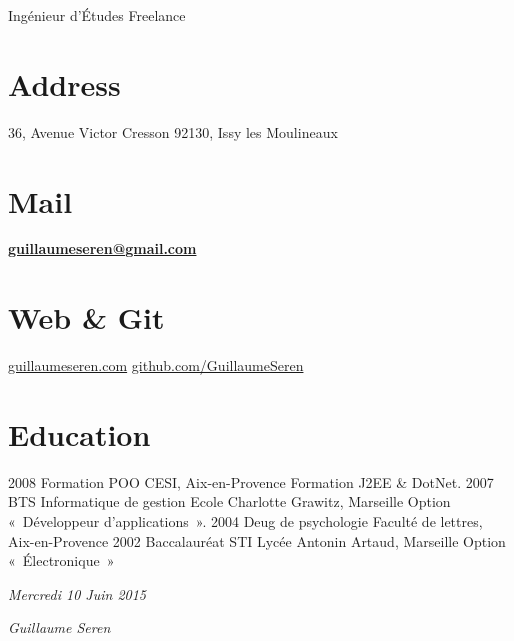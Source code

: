 
      {Ingénieur d'Études Freelance}

\begin{aside}
  \section{Address}
    36, Avenue Victor Cresson
    92130, Issy les Moulineaux
    ~
  \section{Mail}
    \href{mailto:guillaumeseren@gmail.com}{\textbf{guillaumeseren@gmail.com}}
    ~
  \section{Web \& Git}
    \href{http://guillaumeseren.com/}{guillaumeseren.com}
    \href{https://github.com/GuillaumeSeren}{github.com/GuillaumeSeren}
    ~
\end{aside}

\section{Education}
\begin{entrylist}
  \entry
    {2008}
    {Formation POO}
    {CESI, Aix-en-Provence}
    {Formation J2EE \& DotNet.}
  \entry
    {2007}
    {BTS Informatique de gestion}
    {Ecole Charlotte Grawitz, Marseille}
    {Option « Développeur d'applications ».}
  \entry
    {2004}
    {Deug de psychologie}
    {Faculté de lettres, Aix-en-Provence}
    {}
  \entry
    {2002}
    {Baccalauréat STI}
    {Lycée Antonin Artaud, Marseille}
    {Option « Électronique »}
\end{entrylist}

\begin{flushleft}
\emph{Mercredi 10 Juin 2015}
\end{flushleft}

\begin{flushright}
\emph{Guillaume Seren}
\end{flushright}


